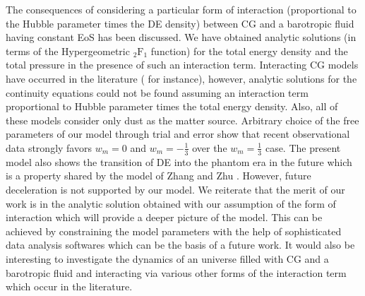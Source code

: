 \documentclass[two-column, nofootinbib]{revtex4-1}
\begin{document}
The consequences of considering a particular form of interaction (proportional to the Hubble parameter times the DE density) between CG and a barotropic fluid having constant EoS has been discussed. We have obtained analytic solutions (in terms of the Hypergeometric $_2\text{F}_1$ function) for the total energy density and the total pressure in the presence of such an interaction term. Interacting CG models have occurred in the literature (\cite{Zhang1} for instance), however, analytic solutions for the continuity equations could not be found assuming an interaction term proportional to Hubble parameter times the total energy density. Also, all of these models consider only dust as the matter source. Arbitrary choice of the free parameters of our model through trial and error show that recent observational data strongly favors $w_m=0$ and $w_m=-\frac{1}{3}$ over the $w_m=\frac{1}{3}$ case. The present model also shows the transition of DE into the phantom era in the future which is a property shared by the model of Zhang and Zhu \cite{Zhang1}. %
However, future deceleration is not supported by our model. We reiterate that the merit of our work is in the analytic solution obtained with our assumption of the form of interaction which will provide a deeper picture of the model. This can be achieved by constraining the model parameters with the help of sophisticated data analysis softwares which can be the basis of a future work. %
It would also be interesting to investigate the dynamics of an universe filled with CG and a barotropic fluid and interacting via various other forms of the interaction term which occur in the literature.  
\end{document}
